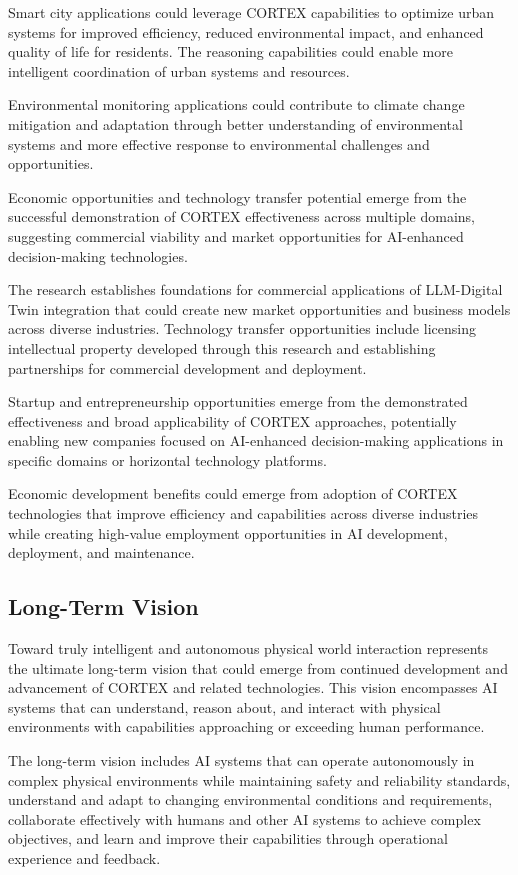 Smart city applications could leverage CORTEX capabilities to optimize urban systems for improved efficiency, reduced environmental impact, and enhanced quality of life for residents. The reasoning capabilities could enable more intelligent coordination of urban systems and resources.

Environmental monitoring applications could contribute to climate change mitigation and adaptation through better understanding of environmental systems and more effective response to environmental challenges and opportunities.

Economic opportunities and technology transfer potential emerge from the successful demonstration of CORTEX effectiveness across multiple domains, suggesting commercial viability and market opportunities for AI-enhanced decision-making technologies.

The research establishes foundations for commercial applications of LLM-Digital Twin integration that could create new market opportunities and business models across diverse industries. Technology transfer opportunities include licensing intellectual property developed through this research and establishing partnerships for commercial development and deployment.

Startup and entrepreneurship opportunities emerge from the demonstrated effectiveness and broad applicability of CORTEX approaches, potentially enabling new companies focused on AI-enhanced decision-making applications in specific domains or horizontal technology platforms.

Economic development benefits could emerge from adoption of CORTEX technologies that improve efficiency and capabilities across diverse industries while creating high-value employment opportunities in AI development, deployment, and maintenance.

\subsection{Long-Term Vision}

Toward truly intelligent and autonomous physical world interaction represents the ultimate long-term vision that could emerge from continued development and advancement of CORTEX and related technologies. This vision encompasses AI systems that can understand, reason about, and interact with physical environments with capabilities approaching or exceeding human performance.

The long-term vision includes AI systems that can operate autonomously in complex physical environments while maintaining safety and reliability standards, understand and adapt to changing environmental conditions and requirements, collaborate effectively with humans and other AI systems to achieve complex objectives, and learn and improve their capabilities through operational experience and feedback.

